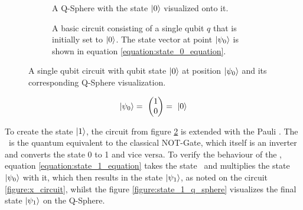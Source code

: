 \begin{figure}[!h]
    \begin{subfigure}{.5\textwidth}
    \centering
        \scalebox{\qspherewidth}{
            
        }
        \caption{A Q-Sphere with the state $\ket{0}$ visualized onto it.}
        \label{figure:state_0_q_sphere}
    \end{subfigure}
    \begin{subfigure}{.5\textwidth}
    \centering
        \caption{A basic circuit consisting of a single qubit $q$ that is initially set to $\ket{0}$. The state vector at point $\ket{\psi_0}$ is shown in equation \ref{equation:state_0_equation}.}
        \label{figure:state_0_circuit}
    \end{subfigure}
    \caption{A single qubit circuit with qubit state $\ket{0}$ at position $\ket{\psi_0}$ and its corresponding Q-Sphere visualization.}
    \label{fig:showcase_qubit_state_0_with_circuit}
\end{figure}



\begin{equation}
    \centering
    \begin{split}
        \ket{\psi_0} =\ \begin{pmatrix}1 \\ 0\end{pmatrix} =\ \ket{0}\\
    \end{split}
    \label{equation:state_0_equation}
\end{equation}

\newpage

To create the state $\ket{1}$, the circuit from figure \ref{figure:state_0_circuit} is extended with the Pauli \xgate\cite{qiskit_xgate_nodate}. The \xgate\ is the quantum equivalent to the classical NOT-Gate, which itself is an inverter and converts the state 0 to 1 and vice versa. To verify the behaviour of the \xgate, equation \ref{equation:state_1_equation} takes the state \xgate\ and multiplies the state $\ket{\psi_0}$ with it, which then results in the state $\ket{\psi_1}$, as noted on the circuit \ref{figure:x_circuit}, whilst the figure \ref{figure:state_1_q_sphere} visualizes the final state $\ket{\psi_1}$ on the Q-Sphere.

